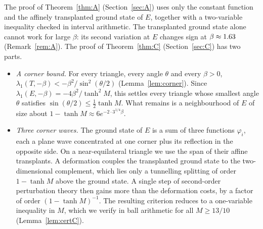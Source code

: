 \documentclass[11pt]{article}
\theoremstyle{remark}
\newcommand{\E}{E}
\begin{document}
The proof of Theorem~\ref{thm:A} (Section~\ref{sec:A}) uses only the constant function and the affinely
transplanted ground state of $\E$, together with a two-variable inequality checked in interval
arithmetic. The transplanted ground state alone cannot work for large $\beta$: its second variation at
$\E$ changes sign at $\beta\approx1.63$ (Remark~\ref{rem:A}). The proof of
Theorem~\ref{thm:C} (Section~\ref{sec:C}) has two parts.
\begin{itemize}
\item \emph{A corner bound.} For every triangle, every angle $\theta$ and every $\beta>0$,
$\lambda_1(T,-\beta)<-\beta^2/\sin^2(\theta/2)$ (Lemma~\ref{lem:corner}). Since
$\lambda_1(\E,-\beta)=-4\beta^2/\tanh^2M$, this settles every triangle whose smallest angle $\theta$
satisfies $\sin(\theta/2)\le\frac12\tanh M$. What remains is a neighbourhood of $\E$ of size about
$1-\tanh M\approx6e^{-2\cdot3^{1/4}\beta}$.
\item \emph{Three corner waves.} The ground state of $\E$ is a sum of three functions $\varphi_i$, each a
plane wave concentrated at one corner plus its reflection in the opposite side. On a near-equilateral
triangle we use the span of their affine transplants. A deformation couples the transplanted ground
state to the two-dimensional complement, which lies only a tunnelling splitting of order $1-\tanh M$
above the ground state. A single step of second-order perturbation theory then gains more than the
deformation costs, by a factor of order $(1-\tanh M)^{-1}$. The resulting criterion reduces to a
one-variable inequality in $M$, which we verify in ball arithmetic for all $M\ge13/10$
(Lemma~\ref{lem:certC}).
\end{itemize}
\end{document}
